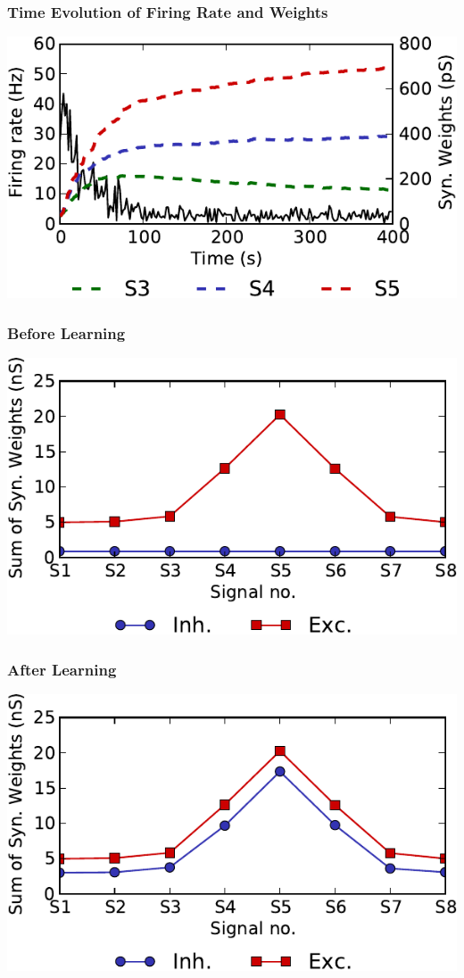 \documentclass{beamer}
\begin{document}
\begin{frame} \frametitle{Time Evolution of Firing Rate and Weights}
    \begin{center}
        \includegraphics[width=\textwidth]{figures/evo_orig}
    \end{center}
\end{frame}

\begin{frame} \frametitle{Before Learning}
    \begin{center}
        \includegraphics[width=\textwidth]{figures/weights_before}
    \end{center}
\end{frame}

\begin{frame} \frametitle{After Learning}
    \begin{center}
        \includegraphics[width=\textwidth]{figures/weights_after}
    \end{center}
\end{frame}
\end{document}
